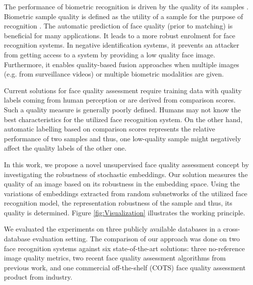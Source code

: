 \documentclass[10pt,twocolumn,letterpaper]{article}
\begin{document}
The performance of biometric recognition is driven by the quality of its samples \cite{DBLP:journals/corr/Best-RowdenJ17}. 
Biometric sample quality is defined as the utility of a sample for the purpose of recognition \cite{DBLP:journals/corr/abs-1904-01740, 6712715, 10.1007/978-3-540-74549-5_26, DBLP:journals/corr/Best-RowdenJ17}.
The automatic prediction of face quality (prior to matching) is beneficial for many applications.
It leads to a more robust enrolment for face recognition systems.
In negative identification systems, it prevents an attacker from getting access to a system by providing a low quality face image.
Furthermore, it enables quality-based fusion approaches when multiple images \cite{DBLP:conf/icpr/DamerSN14} (e.g. from surveillance videos) or multiple biometric modalities are given.

Current solutions for face quality assessment require training data with quality labels coming from human perception or are derived from comparison scores.
Such a quality measure is generally poorly defined.
Humans may not know the best characteristics for the utilized face recognition system.
On the other hand, automatic labelling based on comparison scores represents the relative performance of two samples and thus, one low-quality sample might negatively affect the quality labels of the other one.


In this work, we propose a novel unsupervised face quality assessment concept by investigating the robustness of stochastic embeddings.
Our solution measures the quality of an image based on its robustness in the embedding space.
Using the variations of embeddings extracted from random subnetworks of the utilized face recognition model, the representation robustness of the sample and thus, its quality is determined.
Figure \ref{fig:Visualization} illustrates the working principle.



We evaluated the experiments on three publicly available databases in a cross-database evaluation setting. 
The comparison of our approach was done on two face recognition systems against six state-of-the-art solutions:
three no-reference image quality metrics, two recent face quality assessment algorithms from previous work, and one commercial off-the-shelf (COTS) face quality assessment product from industry.
\end{document}
